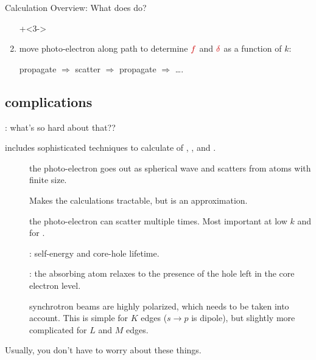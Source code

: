 \begin{slide}{{\feff} Calculation Overview: What does {\feff} do? }
\begin{cenpage}{135mm}
\begin{enumerate}
  \onslide+<3->\item move photo-electron along path to determine
    $\Red{f}$ and $\Red{\delta}$ as a function of $k$:

    \begin{center}
      propagate $\Rightarrow$ scatter $\Rightarrow$ propagate $\Rightarrow$ \ldots.
    \end{center}

  \end{enumerate}

\end{cenpage}  \end{slide}

\subsection{{\feff}   complications}
\begin{slide}{{\feff}: what's so hard about that??}

  \begin{cenpage}{135mm}

    {\feff} includes sophisticated techniques to calculate of ,
    , and .

    \begin{description}
    \item[] the photo-electron goes out as
      spherical wave and scatters from atoms with finite size.

    \item[] Makes the calculations
      tractable, but is an approximation.

    \item[]  the photo-electron can scatter
      multiple times. Most important at low $k$ and for .

    \item[] {}: self-energy and
      core-hole lifetime.

    \item[] {}: the absorbing atom
      relaxes to the presence of the hole left in the core electron level.

    \item[] synchrotron beams are highly
      polarized, which needs to be taken into account.  This is simple for
      $K$ edges ($s\rightarrow p$ is dipole), but slightly more complicated for
      $L$ and $M$ edges.

    \end{description}

\vmm
\begin{center} Usually, you don't have to worry about these things.\end{center}

\end{cenpage}  \end{slide}


